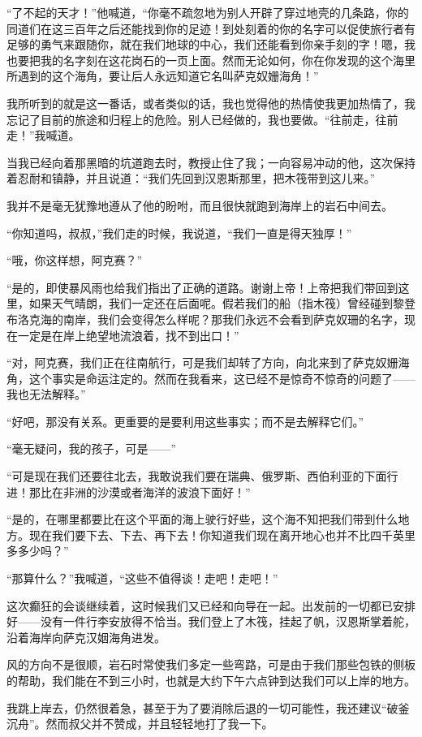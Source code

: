 \documentclass[10pt]{book}
\begin{document}
“了不起的天才！”他喊道，“你毫不疏忽地为别人开辟了穿过地壳的几条路，你的同道们在这三百年之后还能找到你的足迹！到处刻着的你的名字可以促使旅行者有足够的勇气来跟随你，就在我们地球的中心，我们还能看到你亲手刻的字！嗯，我也要把我的名字刻在这花岗石的一页上面。然而无论如何，你在你发现的这个海里所遇到的这个海角，要让后人永远知道它名叫萨克奴姗海角！”

我所听到的就是这一番话，或者类似的话，我也觉得他的热情使我更加热情了，我忘记了目前的旅途和归程上的危险。别人已经做的，我也要做。“往前走，往前走！”我喊道。

当我已经向着那黑暗的坑道跑去时，教授止住了我；一向容易冲动的他，这次保持着忍耐和镇静，并且说道：“我们先回到汉恩斯那里，把木筏带到这儿来。”

我并不是毫无犹豫地遵从了他的盼咐，而且很快就跑到海岸上的岩石中间去。

“你知道吗，叔叔，”我们走的时候，我说道，“我们一直是得天独厚！”

“哦，你这样想，阿克赛？”

“是的，即使暴风雨也给我们指出了正确的道路。谢谢上帝！上帝把我们带回到这里，如果天气晴朗，我们一定还在后面呢。假若我们的船（指木筏）曾经碰到黎登布洛克海的南岸，我们会变得怎么样呢？那我们永远不会看到萨克奴珊的名字，现在一定是在岸上绝望地流浪着，找不到出口！”

“对，阿克赛，我们正在往南航行，可是我们却转了方向，向北来到了萨克奴姗海角，这个事实是命运注定的。然而在我看来，这已经不是惊奇不惊奇的问题了——我也无法解释。”

“好吧，那没有关系。更重要的是要利用这些事实；而不是去解释它们。”

“毫无疑问，我的孩子，可是——”

“可是现在我们还要往北去，我敢说我们要在瑞典、俄罗斯、西伯利亚的下面行进！那比在非洲的沙漠或者海洋的波浪下面好！”

“是的，在哪里都要比在这个平面的海上驶行好些，这个海不知把我们带到什么地方。现在我们要下去、下去、再下去！你知道我们现在离开地心也并不比四千英里多多少吗？”

“那算什么？”我喊道，“这些不值得谈！走吧！走吧！”

这次癫狂的会谈继续着，这时候我们又已经和向导在一起。出发前的一切都已安排好——没有一件行李安放得不恰当。我们登上了木筏，挂起了帆，汉恩斯掌着舵，沿着海岸向萨克汉姻海角进发。

风的方向不是很顺，岩石时常使我们多定一些弯路，可是由于我们那些包铁的侧板的帮助，我们能在不到三小时，也就是大约下午六点钟到达我们可以上岸的地方。

我跳上岸去，仍然很着急，甚至于为了要消除后退的一切可能性，我还建议“破釜沉舟”。然而叔父并不赞成，并且轻轻地打了我一下。
\end{document}
